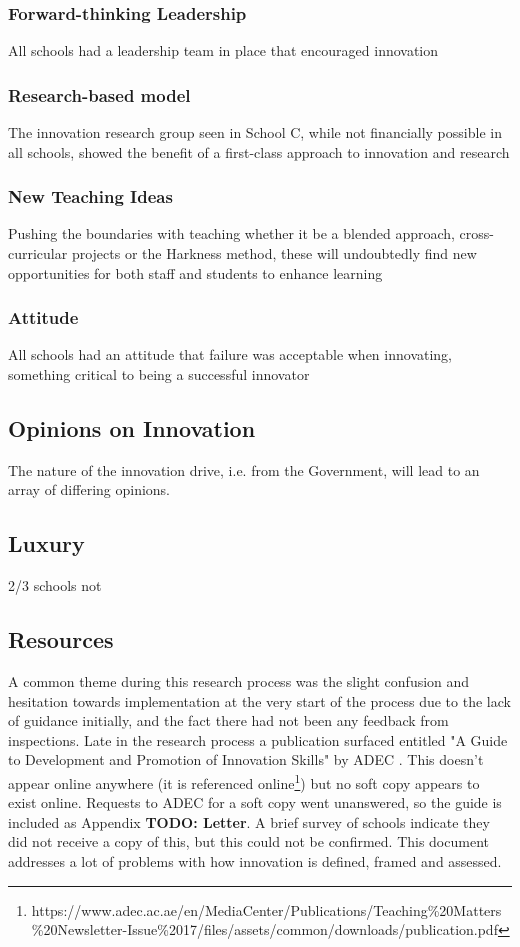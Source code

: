 \subsubsection{Forward-thinking Leadership}
All schools had a leadership team in place that encouraged innovation 

\subsubsection{Research-based model}
The innovation research group seen in School C, while not financially possible in all schools, 
showed the benefit of a first-class approach to innovation and research

\subsubsection{New Teaching Ideas}
Pushing the boundaries with teaching whether it be a blended approach, cross-curricular projects or the Harkness method, these will undoubtedly find new opportunities for both staff and students to enhance learning 

\subsubsection{Attitude}
All schools had an attitude that failure was acceptable when innovating, something critical to being a successful innovator 

\subsection{Opinions on Innovation}

The nature of the innovation drive, i.e. from the Government, will lead to an array of differing opinions.

\subsection{Luxury}
2/3 schools not \cite{ADEC2016 pi.3}

\subsection{Resources}
A common theme during this research process was the slight confusion and hesitation towards implementation at the very start of the process due to the lack of guidance initially, and the fact there had not been any feedback from inspections. Late in the research process a publication surfaced entitled "A Guide to Development and Promotion of Innovation Skills" by ADEC \citet{ADEC2015a}. This doesn't appear online anywhere (it is referenced online\footnote{https://www.adec.ac.ae/en/MediaCenter/Publications/Teaching\%20Matters\%20Newsletter-Issue\%2017/files/assets/common/downloads/publication.pdf}) but no soft copy appears to exist online. Requests to ADEC for a soft copy went unanswered, so the guide is included as Appendix \textbf{TODO: Letter}. A brief survey of schools indicate they did not receive a copy of this, but this could not be confirmed. This document addresses a lot of problems with how innovation is defined, framed and assessed.

